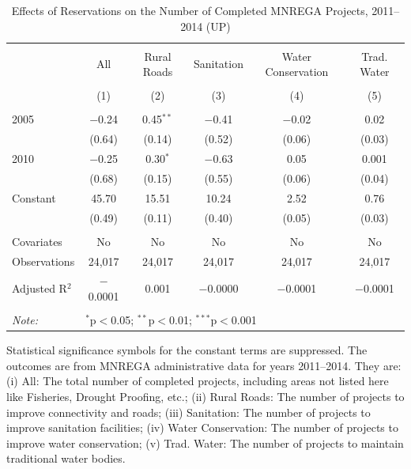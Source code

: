 \begin{table}[!htbp]
\centering
\begin{threeparttable}

  \caption{Effects of Reservations on the Number of Completed MNREGA Projects, 2011--2014 (UP)} 
  \label{main_mnrega_up_2005_2010} 
\scriptsize 
\begin{tabular}{@{\extracolsep{0pt}}lccccc} 
\\[-1.8ex]\hline 
\hline \\[-1.8ex] 
 & All & Rural Roads & Sanitation & Water Conservation & Trad. Water \\ 
\\[-1.8ex] & (1) & (2) & (3) & (4) & (5)\\ 
\hline \\[-1.8ex] 
 2005 & $-$0.24 & 0.45$^{**}$ & $-$0.41 & $-$0.02 & 0.02 \\ 
  & (0.64) & (0.14) & (0.52) & (0.06) & (0.03) \\ 
  2010 & $-$0.25 & 0.30$^{*}$ & $-$0.63 & 0.05 & 0.001 \\ 
  & (0.68) & (0.15) & (0.55) & (0.06) & (0.04) \\ 
  Constant & 45.70 & 15.51 & 10.24 & 2.52 & 0.76 \\ 
  & (0.49) & (0.11) & (0.40) & (0.05) & (0.03) \\ 
 \hline \\[-1.8ex] 
Covariates & No & No & No & No & No \\ 
Observations & 24,017 & 24,017 & 24,017 & 24,017 & 24,017 \\ 
Adjusted R$^{2}$ & $-$0.0001 & 0.001 & $-$0.0000 & $-$0.0001 & $-$0.0001 \\ 
\hline 
\hline \\[-1.8ex] 
\textit{Note:}  & \multicolumn{5}{l}{$^{*}$p$<$0.05; $^{**}$p$<$0.01; $^{***}$p$<$0.001} \\ 
\end{tabular} 
\begin{tablenotes}[flushleft]
\scriptsize
\item[] Statistical significance symbols for the constant terms are suppressed. The outcomes are from MNREGA administrative data for years 2011--2014. They are:
(i) All: The total number of completed projects, including areas not listed here
like Fisheries, Drought Proofing, etc.;
(ii) Rural Roads: The number of projects to improve connectivity and roads;
(iii) Sanitation: The number of projects to improve sanitation facilities;
(iv) Water Conservation: The number of projects to improve water conservation;
(v) Trad. Water: The number of projects to maintain traditional water bodies.
\end{tablenotes}
\end{threeparttable}
\end{table}
